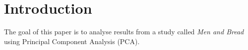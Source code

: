 \chapter*{Introduction}
\label{introduction}
%
The goal of this paper is to analyse results from a study called \textit{Men and Bread} using Principal Component Analysis (PCA). 







